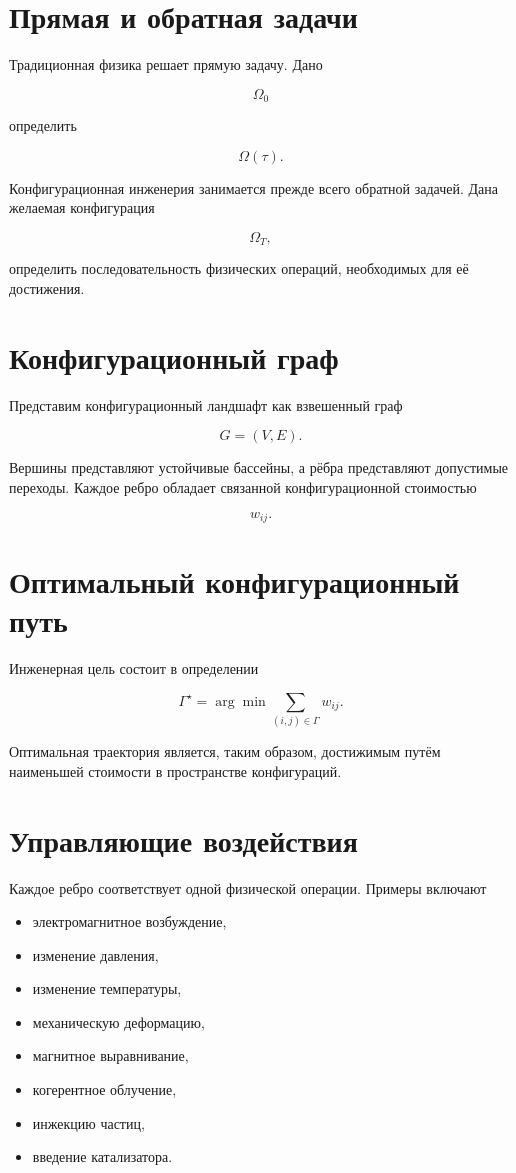 \section{Прямая и обратная задачи}

Традиционная физика решает прямую задачу. Дано

\[ \Omega_0 \]

определить

\[ \Omega(\tau). \]

Конфигурационная инженерия занимается прежде всего обратной задачей. Дана желаемая конфигурация

\[ \Omega_T, \]

определить последовательность физических операций, необходимых для её достижения.

\section{Конфигурационный граф}

Представим конфигурационный ландшафт как взвешенный граф

\[ G=(V,E). \]

Вершины представляют устойчивые бассейны, а рёбра представляют допустимые переходы. Каждое ребро обладает связанной конфигурационной стоимостью

\[ w_{ij}. \]

\section{Оптимальный конфигурационный путь}

Инженерная цель состоит в определении

\[ \boxed{ \Gamma^\star = \arg\min \sum_{(i,j)\in\Gamma} w_{ij}. } \]

Оптимальная траектория является, таким образом, достижимым путём наименьшей стоимости в пространстве конфигураций.

\section{Управляющие воздействия}

Каждое ребро соответствует одной физической операции. Примеры включают

\begin{itemize}
\item электромагнитное возбуждение,
\item изменение давления,
\item изменение температуры,
\item механическую деформацию,
\item магнитное выравнивание,
\item когерентное облучение,
\item инжекцию частиц,
\item введение катализатора.
\end{itemize}

